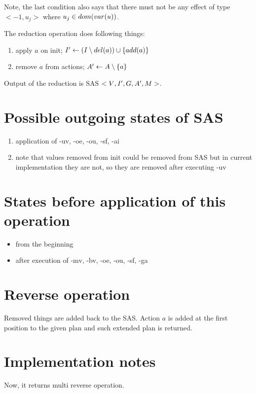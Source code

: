 Note, the last condition also says that there must not be any effect of type $<-1,u_j>$ where $u_j \in dom(var(u))$.

The reduction operation does following things:
\begin{enumerate}
	\item apply $a$ on init; $I{}' \leftarrow (I \setminus del(a)) \cup \{add(a)\}$
	\item remove $a$ from actions; $A{}' \leftarrow A \setminus \{a\}$
\end{enumerate}	


Output of the reduction is SAS $<V{}, I{}', G{}, A{}', M{}>$.


\section{Possible outgoing states of SAS}
\begin{enumerate}
	\item application of -uv, -oe, -ou, -sf, -ai
	\item note that values removed from init could be removed from SAS but in current implementation they are not, so they are removed after executing -uv
\end{enumerate}


\section{States before application of this operation}
\begin{itemize}
	\item from the beginning
	\item after execution of -mv, -bv, -oe, -ou, -sf, -ga
\end{itemize}


\section{Reverse operation}
Removed things are added back to the SAS. Action $a$ is added at the first position to the given plan and such extended plan is returned.


\section{Implementation notes}
Now, it returns multi reverse operation.

